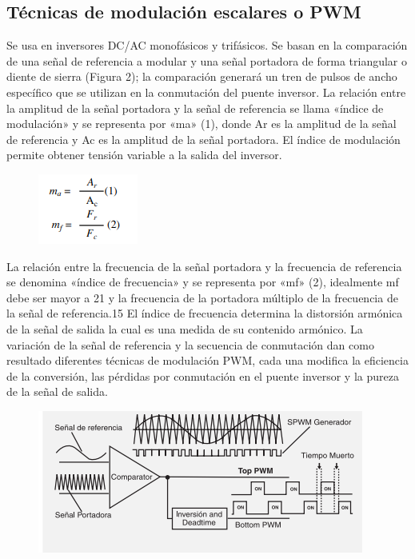 \documentclass[12pt,a4paper]{article}
\begin{document}
\subsection{Técnicas de modulación
escalares o PWM}
Se usa en inversores DC/AC
monofásicos y trifásicos. Se basan
en la comparación de una señal de
referencia a modular y una señal
portadora de forma triangular o
diente de sierra (Figura 2); la comparación generará un tren de pulsos
de ancho específico que se utilizan
en la conmutación del puente inversor. La relación entre la amplitud de
la señal portadora y la señal de referencia se llama «índice de modulación» y se representa por «ma»
(1), donde Ar es la amplitud de la
señal de referencia y Ac es la amplitud de la señal portadora. El índice de modulación permite obtener tensión variable a la salida del
inversor.
\begin{figure}[h!]
\centering
\includegraphics[scale=1]{Captura2.PNG} 
\end{figure}
La relación entre la frecuencia de
la señal portadora y la frecuencia de
referencia se denomina «índice de
frecuencia» y se representa por «mf»
(2), idealmente mf debe ser mayor a
21 y la frecuencia de la portadora
múltiplo de la frecuencia de la señal
de referencia.15 El índice de frecuencia determina la distorsión armónica de la señal de salida la cual es una
medida de su contenido armónico.
La variación de la señal de referencia y la secuencia de conmutación
dan como resultado diferentes técnicas de modulación PWM, cada una
modifica la eficiencia de la conversión, las pérdidas por conmutación
en el puente inversor y la pureza de
la señal de salida.
\begin{figure}[h!]
\centering
\includegraphics[scale=1]{Captura3.PNG} 
\end{figure}
\newpage
\end{document}
